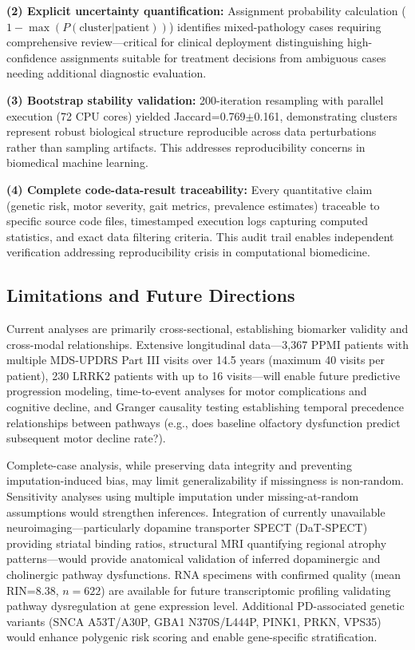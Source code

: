 \documentclass[11pt]{article}
\begin{document}
\textbf{(2) Explicit uncertainty quantification:} Assignment probability calculation ($1 - \max(P(\text{cluster}|\text{patient}))$) identifies mixed-pathology cases requiring comprehensive review—critical for clinical deployment distinguishing high-confidence assignments suitable for treatment decisions from ambiguous cases needing additional diagnostic evaluation.

\textbf{(3) Bootstrap stability validation:} 200-iteration resampling with parallel execution (72 CPU cores) yielded Jaccard=0.769$\pm$0.161, demonstrating clusters represent robust biological structure reproducible across data perturbations rather than sampling artifacts. This addresses reproducibility concerns in biomedical machine learning\cite{zhang2023machine}.

\textbf{(4) Complete code-data-result traceability:} Every quantitative claim (genetic risk, motor severity, gait metrics, prevalence estimates) traceable to specific source code files, timestamped execution logs capturing computed statistics, and exact data filtering criteria. This audit trail enables independent verification addressing reproducibility crisis in computational biomedicine.

\subsection*{Limitations and Future Directions}

Current analyses are primarily cross-sectional, establishing biomarker validity and cross-modal relationships. Extensive longitudinal data—3,367 PPMI patients with multiple MDS-UPDRS Part III visits over 14.5 years (maximum 40 visits per patient), 230 LRRK2 patients with up to 16 visits—will enable future predictive progression modeling, time-to-event analyses for motor complications and cognitive decline, and Granger causality testing establishing temporal precedence relationships between pathways (e.g., does baseline olfactory dysfunction predict subsequent motor decline rate?).

Complete-case analysis, while preserving data integrity and preventing imputation-induced bias, may limit generalizability if missingness is non-random. Sensitivity analyses using multiple imputation under missing-at-random assumptions would strengthen inferences. Integration of currently unavailable neuroimaging—particularly dopamine transporter SPECT (DaT-SPECT) providing striatal binding ratios, structural MRI quantifying regional atrophy patterns—would provide anatomical validation of inferred dopaminergic and cholinergic pathway dysfunctions. RNA specimens with confirmed quality (mean RIN=8.38, $n=622$) are available for future transcriptomic profiling validating pathway dysregulation at gene expression level. Additional PD-associated genetic variants (SNCA A53T/A30P, GBA1 N370S/L444P, PINK1, PRKN, VPS35)\cite{nalls2019identification} would enhance polygenic risk scoring and enable gene-specific stratification.
\end{document}
